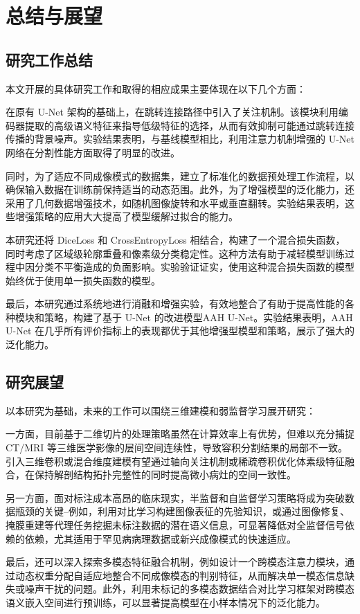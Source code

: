 \section{总结与展望}

\subsection{研究工作总结}
本文开展的具体研究工作和取得的相应成果主要体现在以下几个方面：

在原有 U-Net 架构的基础上，在跳转连接路径中引入了关注机制。该模块利用编码器提取的高级语义特征来指导低级特征的选择，从而有效抑制可能通过跳转连接传播的背景噪声。实验结果表明，与基线模型相比，利用注意力机制增强的 U-Net 网络在分割性能方面取得了明显的改进。

同时，为了适应不同成像模式的数据集，建立了标准化的数据预处理工作流程，以确保输入数据在训练前保持适当的动态范围。此外，为了增强模型的泛化能力，还采用了几何数据增强技术，如随机图像旋转和水平或垂直翻转。实验结果表明，这些增强策略的应用大大提高了模型缓解过拟合的能力。

本研究还将 DiceLoss 和 CrossEntropyLoss 相结合，构建了一个混合损失函数，同时考虑了区域级轮廓重叠和像素级分类稳定性。这种方法有助于减轻模型训练过程中因分类不平衡造成的负面影响。实验验证证实，使用这种混合损失函数的模型始终优于使用单一损失函数的模型。

最后，本研究通过系统地进行消融和增强实验，有效地整合了有助于提高性能的各种模块和策略，构建了基于 U-Net 的改进模型AAH U-Net。实验结果表明，AAH U-Net 在几乎所有评价指标上的表现都优于其他增强型模型和策略，展示了强大的泛化能力。


\subsection{研究展望}

以本研究为基础，未来的工作可以围绕三维建模和弱监督学习展开研究：

一方面，目前基于二维切片的处理策略虽然在计算效率上有优势，但难以充分捕捉 CT/MRI 等三维医学影像的层间空间连续性，导致容积分割结果的局部不一致。引入三维卷积或混合维度建模有望通过轴向关注机制或稀疏卷积优化体素级特征融合，在保持解剖结构拓扑完整性的同时提高微小病灶的空间一致性。

另一方面，面对标注成本高昂的临床现实，半监督和自监督学习策略将成为突破数据瓶颈的关键--例如，利用对比学习构建图像表征的先验知识，或通过图像修复、掩膜重建等代理任务挖掘未标注数据的潜在语义信息，可显著降低对全监督信号依赖的依赖，尤其适用于罕见病病理数据或新兴成像模式的快速适应。

最后，还可以深入探索多模态特征融合机制，例如设计一个跨模态注意力模块，通过动态权重分配自适应地整合不同成像模态的判别特征，从而解决单一模态信息缺失或噪声干扰的问题。此外，利用未标记的多模态数据结合对比学习框架对跨模态语义嵌入空间进行预训练，可以显著提高模型在小样本情况下的泛化能力。